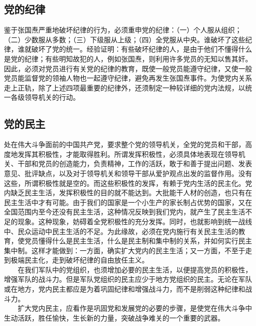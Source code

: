 \documentclass[cn,11pt,chinese]{elegantbook}
\def\myformat#1{\hfil\hfil #1}
\begin{document}
\subsection*{\myformat{党的纪律}}
鉴于张国焘严重地破坏纪律的行为，必须重申党的纪律：（一）个人服从组织；（二）少数服从多数；（三）下级服从上级；（四）全党服从中央。谁破坏了这些纪律，谁就破坏了党的统一。经验证明：有些破坏纪律的人，是由于他们不懂得什么是党的纪律；有些明知故犯的人，例如张国焘，则利用许多党员的无知以售其奸。因此，必须对党员进行有关党的纪律的教育，既使一般党员能遵守纪律，又使一般党员能监督党的领袖人物也一起遵守纪律，避免再发生张国焘事件。为使党内关系走上正轨，除了上述四项最重要的纪律外，还须制定一种较详细的党内法规，以统一各级领导机关的行动。\\
\subsection*{\myformat{党的民主}}
处在伟大斗争面前的中国共产党，要求整个党的领导机关，全党的党员和干部，高度地发挥其积极性，才能取得胜利。所谓发挥积极性，必须具体地表现在领导机关、干部和党员的创造能力，负责精神，工作的活跃，敢于和善于提出问题、发表意见、批评缺点，以及对于领导机关和领导干部从爱护观点出发的监督作用。没有这些，所谓积极性就是空的。而这些积极性的发挥，有赖于党内生活的民主化。党内缺乏民主生活，发挥积极性的目的就不能达到。大批能干人材的创造，也只有在民主生活中才有可能。由于我们的国家是一个小生产的家长制占优势的国家，又在全国范围内至今还没有民主生活，这种情况反映到我们党内，就产生了民主生活不足的现象。这种现象，妨碍着全党积极性的充分发挥。同时，也就影响到统一战线中、民众运动中民主生活的不足。为此缘故，必须在党内施行有关民主生活的教育，使党员懂得什么是民主生活，什么是民主制和集中制的关系，并如何实行民主集中制。这样才能做到：一方面，确实扩大党内的民主生活；又一方面，不至于走到极端民主化，走到破坏纪律的自由放任主义。\\
　　在我们军队中的党组织，也须增加必要的民主生活，以便提高党员的积极性，增强军队的战斗力。但是军队党组织的民主应少于地方党组织的民主。无论在军队或在地方，党内民主都应是为着巩固纪律和增强战斗力，而不是削弱这种纪律和战斗力。\\
　　扩大党内民主，应看作是巩固党和发展党的必要的步骤，是使党在伟大斗争中生动活跃，胜任愉快，生长新的力量，突破战争难关的一个重要的武器。\\
\end{document}
